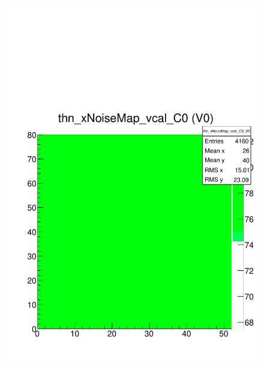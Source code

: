 \documentclass[a4paper,12pt,twoside]{article}
\begin{document}
\begin{figure} [h!]
\centering
\begin{minipage}{.48\textwidth}
  \centering
  \includegraphics[width=\textwidth]{./Figures/HRSCurves_thnMap.pdf}
  \label{HRSCurves-thnMap}
\end{minipage}%
\hspace{2mm}
\begin{minipage}{.48\textwidth}
  \centering

\end{minipage}
\end{figure}
\end{document}
